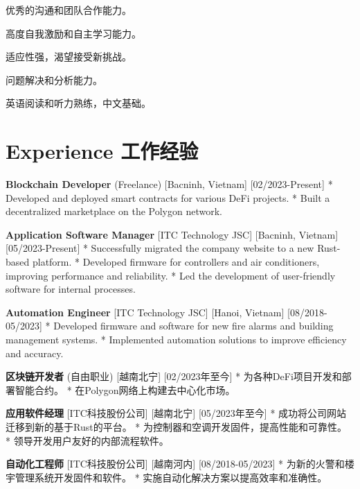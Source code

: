 \documentclass[
]
{article}
\providecommand{\tightlist}{%
  \setlength{\itemsep}{0pt}\setlength{\parskip}{0pt}}
\renewenvironment{itemize}{
  \begin{list}{}{
    \setlength{\leftmargin}{1.5em}
  }
}{
  \end{list}
}
\begin{document}
\begin{figure*}

\begin{itemize}
\tightlist
\item
  优秀的沟通和团队合作能力。
\item
  高度自我激励和自主学习能力。
\item
  适应性强，渴望接受新挑战。
\item
  问题解决和分析能力。
\item
  英语阅读和听力熟练，中文基础。
\end{itemize}

\end{figure*}%

\section{Experience \textbar{}
工作经验}\label{experience-ux5de5ux4f5cux7ecfux9a8c}

\textbf{Blockchain Developer} (Freelance) {[}Bacninh, Vietnam{]}
{[}02/2023-Present{]} * Developed and deployed smart contracts for
various DeFi projects. * Built a decentralized marketplace on the
Polygon network.

\textbf{Application Software Manager} {[}ITC Technology JSC{]}
{[}Bacninh, Vietnam{]} {[}05/2023-Present{]} * Successfully migrated the
company website to a new Rust-based platform. * Developed firmware for
controllers and air conditioners, improving performance and reliability.
* Led the development of user-friendly software for internal processes.

\textbf{Automation Engineer} {[}ITC Technology JSC{]} {[}Hanoi,
Vietnam{]} {[}08/2018-05/2023{]} * Developed firmware and software for
new fire alarms and building management systems. * Implemented
automation solutions to improve efficiency and accuracy.

\begin{figure*}

\textbf{区块链开发者} (自由职业) {[}越南北宁{]} {[}02/2023年至今{]} *
为各种DeFi项目开发和部署智能合约。 * 在Polygon网络上构建去中心化市场。

\textbf{应用软件经理} {[}ITC科技股份公司{]} {[}越南北宁{]}
{[}05/2023年至今{]} * 成功将公司网站迁移到新的基于Rust的平台。 *
为控制器和空调开发固件，提高性能和可靠性。 *
领导开发用户友好的内部流程软件。

\textbf{自动化工程师} {[}ITC科技股份公司{]} {[}越南河内{]}
{[}08/2018-05/2023{]} * 为新的火警和楼宇管理系统开发固件和软件。 *
实施自动化解决方案以提高效率和准确性。

\end{figure*}%
\end{document}
